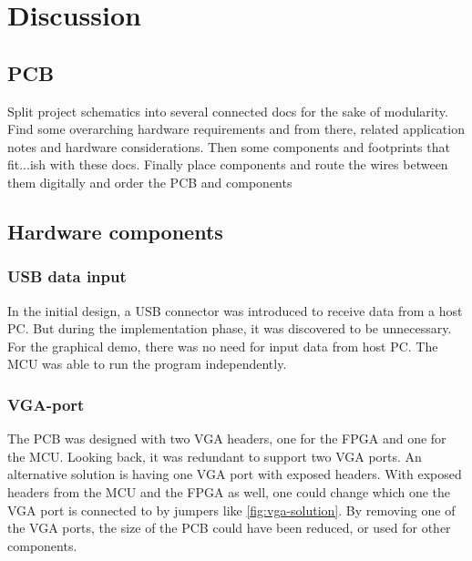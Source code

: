 \documentclass[../main/report.tex]{subfiles}
\begin{document}
\chapter{Discussion}



\section{PCB}
Split project schematics into several connected docs for the sake of modularity. Find some overarching hardware requirements and from there, related application notes and hardware considerations. Then some components and footprints that fit...ish with these docs.
Finally place components and route the wires between them digitally and order the PCB and components


\section{Hardware components}

\subsection{USB data input}
In the initial design, a USB connector was introduced to receive data from a host PC. 
But during the implementation phase, it was discovered to be unnecessary.
For the graphical demo, there was no need for input data from host PC. 
The MCU was able to run the program independently.


\subsection{VGA-port}
The PCB was designed with two VGA headers, one for the FPGA and one for the MCU. 
Looking back, it was redundant to support two VGA ports.
An alternative solution is having one VGA port with exposed headers.
With exposed headers from the MCU and the FPGA as well, one could change which one the VGA port is connected to by jumpers like \ref{fig:vga-solution}.
By removing one of the VGA ports, the size of the PCB could have been reduced, or used for other components. 
\end{document}
